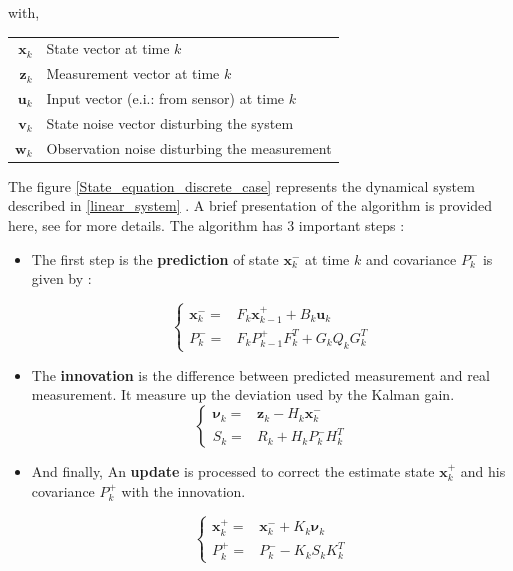 \documentclass[twocolumn]{bmcart}
\begin{document}
with,

\begin{center}
\begin{tabular}{rl}
$\textbf{x}_{k} $ &State vector at time $k$\\
$\textbf{z}_{k} $ &Measurement vector at time $k$\\
$\textbf{u}_{k} $ & Input vector (e.i.: from sensor) at time $k$ \\
$\textbf{v}_{k} $ & State noise vector disturbing the system\\
$\textbf{w}_{k} $ & Observation noise disturbing the measurement\\
\end{tabular}
\end{center}

\vspace{0.2cm}


The figure \ref{State_equation_discrete_case} represents the dynamical system described in \ref{linear_system} . A brief presentation of the algorithm is provided here,  see \cite{terejanu2013discrete} for more details. The algorithm has 3 important steps :\\



\begin{itemize}
\item The first step is the \textbf{prediction} of state $\textbf{x}^-_{k}$ at time $k$ and covariance $P^-_{k}$ is given by :

\begin{equation}
\left\{ \begin{array}{cl}
\textbf{x}^-_{k} = & F_{k}\textbf{x}^+_{k-1} + B_{k}\textbf{u}_{k} \\
P^-_{k} = & F_{k}P^+_{k-1}F^T_{k}+G_{k}Q_{k}G^T_{k}
\end{array}
\right.
\end{equation}

\item The \textbf{innovation} is the difference between predicted measurement and real measurement. It measure up the deviation used by the Kalman gain.
\begin{equation}
\left\{ \begin{array}{cl}
\boldsymbol\nu_{k} = & \textbf{z}_{k}-H_{k}\textbf{x}^-_{k} \\
S_{k} = & R_{k} +H_{k}P^-_{k}H^T_{k}
\end{array}
\right.
\end{equation}

\item And finally, An \textbf{update} is processed to correct the estimate state $\textbf{x}^+_{k} $ and his covariance $P^+_{k}$ with the innovation.

\begin{equation}
\left\{ \begin{array}{cl}
\textbf{x}^+_{k} = & \textbf{x}^-_{k} + K_{k}\boldsymbol\nu_{k} \\
P^+_{k} = &P^-_{k} - K_{k}S_{k}K^T_{k}
\end{array}
\right.
\end{equation}

\end{itemize}
\end{document}
